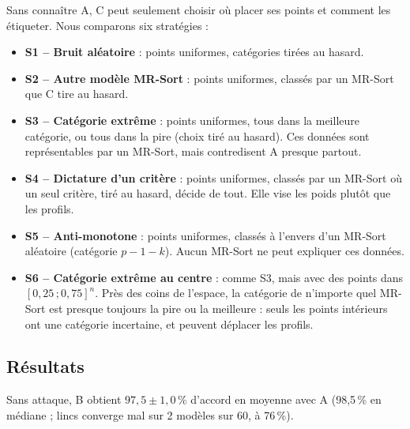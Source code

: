 \documentclass[11pt,a4paper]{article}
\begin{document}
Sans connaître A, C peut seulement choisir où placer ses points et comment les étiqueter. Nous comparons six
stratégies :
\begin{itemize}
  \item \textbf{S1 -- Bruit aléatoire} : points uniformes, catégories tirées au hasard.
  \item \textbf{S2 -- Autre modèle MR-Sort} : points uniformes, classés par un MR-Sort que C tire au hasard.
  \item \textbf{S3 -- Catégorie extrême} : points uniformes, tous dans la meilleure catégorie, ou tous dans la
        pire (choix tiré au hasard). Ces données sont représentables par un MR-Sort, mais contredisent A
        presque partout.
  \item \textbf{S4 -- Dictature d'un critère} : points uniformes, classés par un MR-Sort où un seul critère, tiré
        au hasard, décide de tout. Elle vise les poids plutôt que les profils.
  \item \textbf{S5 -- Anti-monotone} : points uniformes, classés à l'envers d'un MR-Sort aléatoire (catégorie
        $p-1-k$). Aucun MR-Sort ne peut expliquer ces données.
  \item \textbf{S6 -- Catégorie extrême au centre} : comme S3, mais avec des points dans $[0{,}25\,;0{,}75]^n$.
        Près des coins de l'espace, la catégorie de n'importe quel MR-Sort est presque toujours la pire ou la
        meilleure : seuls les points intérieurs ont une catégorie incertaine, et peuvent déplacer les profils.
\end{itemize}

\subsection{Résultats}

Sans attaque, B obtient $97{,}5 \pm 1{,}0$\,\% d'accord en moyenne avec A (98,5\,\% en médiane ; lincs converge
mal sur 2 modèles sur 60, à 76\,\%).
\end{document}
